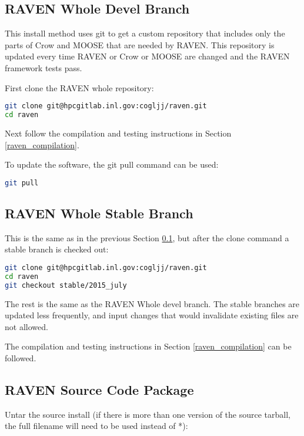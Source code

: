\subsection{RAVEN Whole Devel Branch}
\label{raven_whole_devel}

This install method uses git to get a custom repository that includes
only the parts of Crow and MOOSE that are needed by RAVEN.  This
repository is updated every time RAVEN or Crow or MOOSE are changed
and the RAVEN framework tests pass.

First clone the RAVEN whole repository:

\begin{lstlisting}[language=bash]
git clone git@hpcgitlab.inl.gov:cogljj/raven.git
cd raven
\end{lstlisting}

Next follow the compilation and testing instructions in Section \ref{raven_compilation}.

To update the software, the git pull command can be used:

\begin{lstlisting}[language=bash]
git pull
\end{lstlisting}

\subsection{RAVEN Whole Stable Branch}
\label{raven_whole_stable}

This is the same as in the previous Section \ref{raven_whole_devel},
but after the clone command a stable branch is checked out:

\begin{lstlisting}[language=bash]
git clone git@hpcgitlab.inl.gov:cogljj/raven.git
cd raven
git checkout stable/2015_july
\end{lstlisting}

The rest is the same as the RAVEN Whole devel branch.  The stable
branches are updated less frequently, and input changes that would
invalidate existing files are not allowed.

The compilation and testing instructions in Section
\ref{raven_compilation} can be followed.

\subsection{RAVEN Source Code Package}
\label{raven_source_package}

Untar the source install (if there is more than one version of the
source tarball, the full filename will need to be used instead of *):

